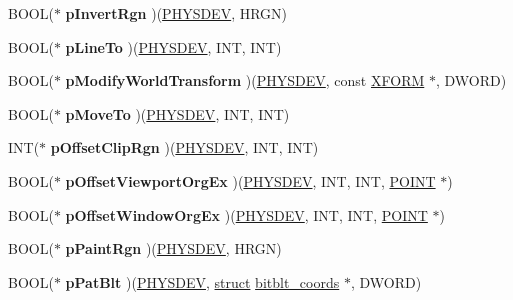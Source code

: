 \begin{DoxyCompactItemize}
B\+O\+OL($\ast$ {\bfseries p\+Invert\+Rgn} )(\hyperlink{structgdi__physdev}{P\+H\+Y\+S\+D\+EV}, H\+R\+GN)
\item 
\mbox{\label{structgdi__dc__funcs_aa6ba652f572d5465818b2936acea8567}} 
B\+O\+OL($\ast$ {\bfseries p\+Line\+To} )(\hyperlink{structgdi__physdev}{P\+H\+Y\+S\+D\+EV}, I\+NT, I\+NT)
\item 
\mbox{\label{structgdi__dc__funcs_a348ecc14b0f9884da690c50ba567f74b}} 
B\+O\+OL($\ast$ {\bfseries p\+Modify\+World\+Transform} )(\hyperlink{structgdi__physdev}{P\+H\+Y\+S\+D\+EV}, const \hyperlink{struct___x_f_o_r_m}{X\+F\+O\+RM} $\ast$, D\+W\+O\+RD)
\item 
\mbox{\label{structgdi__dc__funcs_a200cb77b4787d9c5a39b9775f5026632}} 
B\+O\+OL($\ast$ {\bfseries p\+Move\+To} )(\hyperlink{structgdi__physdev}{P\+H\+Y\+S\+D\+EV}, I\+NT, I\+NT)
\item 
\mbox{\label{structgdi__dc__funcs_ae6cae73e048528d9d8514c5f6a8125d8}} 
I\+NT($\ast$ {\bfseries p\+Offset\+Clip\+Rgn} )(\hyperlink{structgdi__physdev}{P\+H\+Y\+S\+D\+EV}, I\+NT, I\+NT)
\item 
\mbox{\label{structgdi__dc__funcs_a6e4f25596b5151e0659bdae40d9705bd}} 
B\+O\+OL($\ast$ {\bfseries p\+Offset\+Viewport\+Org\+Ex} )(\hyperlink{structgdi__physdev}{P\+H\+Y\+S\+D\+EV}, I\+NT, I\+NT, \hyperlink{structtag_p_o_i_n_t}{P\+O\+I\+NT} $\ast$)
\item 
\mbox{\label{structgdi__dc__funcs_ac87fbbcba0bb4124e85e4f7f37ede4ce}} 
B\+O\+OL($\ast$ {\bfseries p\+Offset\+Window\+Org\+Ex} )(\hyperlink{structgdi__physdev}{P\+H\+Y\+S\+D\+EV}, I\+NT, I\+NT, \hyperlink{structtag_p_o_i_n_t}{P\+O\+I\+NT} $\ast$)
\item 
\mbox{\label{structgdi__dc__funcs_a5308cb976776002c17182dc162540091}} 
B\+O\+OL($\ast$ {\bfseries p\+Paint\+Rgn} )(\hyperlink{structgdi__physdev}{P\+H\+Y\+S\+D\+EV}, H\+R\+GN)
\item 
\mbox{\label{structgdi__dc__funcs_a915e2ed7b47fd7edf5fd4f064e2c10ef}} 
B\+O\+OL($\ast$ {\bfseries p\+Pat\+Blt} )(\hyperlink{structgdi__physdev}{P\+H\+Y\+S\+D\+EV}, \hyperlink{interfacestruct}{struct} \hyperlink{structbitblt__coords}{bitblt\+\_\+coords} $\ast$, D\+W\+O\+RD)

\end{DoxyCompactItemize}

